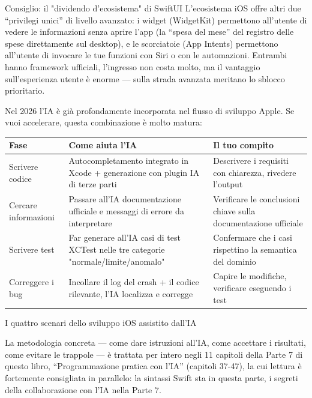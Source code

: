 \begin{tcbinfo}{Consiglio: il "dividendo d'ecosistema" di SwiftUI}
L'ecosistema iOS offre altri due “privilegi unici” di livello avanzato: i widget (WidgetKit) permettono all'utente di vedere le informazioni senza aprire l'app (la “spesa del mese” del registro delle spese direttamente sul desktop), e le scorciatoie (App Intents) permettono all'utente di invocare le tue funzioni con Siri o con le automazioni. Entrambi hanno framework ufficiali, l'ingresso non costa molto, ma il vantaggio sull'esperienza utente è enorme — sulla strada avanzata meritano lo sblocco prioritario.

\end{tcbinfo}


Nel 2026 l'IA è già profondamente incorporata nel flusso di sviluppo Apple. Se vuoi accelerare, questa combinazione è molto matura:

\begin{center}
\begin{tabularx}{\linewidth}{|X|X|X|}
\hline
\textbf{Fase} & \textbf{Come aiuta l'IA} & \textbf{Il tuo compito} \tabularnewline
\hline
Scrivere codice & Autocompletamento integrato in Xcode + generazione con plugin IA di terze parti & Descrivere i requisiti con chiarezza, rivedere l'output \tabularnewline
Cercare informazioni & Passare all'IA documentazione ufficiale e messaggi di errore da interpretare & Verificare le conclusioni chiave sulla documentazione ufficiale \tabularnewline
Scrivere test & Far generare all'IA casi di test XCTest nelle tre categorie "normale/limite/anomalo" & Confermare che i casi rispettino la semantica del dominio \tabularnewline
Correggere i bug & Incollare il log del crash + il codice rilevante, l'IA localizza e corregge & Capire le modifiche, verificare eseguendo i test \tabularnewline
\hline
\end{tabularx}
\end{center}

\begin{center}\small\color{gray}I quattro scenari dello sviluppo iOS assistito dall'IA\end{center}

La metodologia concreta — come dare istruzioni all'IA, come accettare i risultati, come evitare le trappole — è trattata per intero negli 11 capitoli della Parte 7 di questo libro, “Programmazione pratica con l'IA” (capitoli 37-47), la cui lettura è fortemente consigliata in parallelo: la sintassi Swift sta in questa parte, i segreti della collaborazione con l'IA nella Parte 7.

